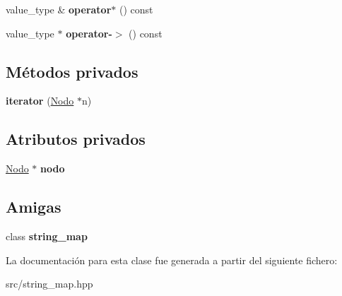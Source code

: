 \begin{DoxyCompactItemize}
\item 
\hypertarget{classstring__map_1_1iterator_a9275f28d7915452c12354017ee945dbd}{value\+\_\+type \& {\bfseries operator$\ast$} () const }\label{classstring__map_1_1iterator_a9275f28d7915452c12354017ee945dbd}

\item 
\hypertarget{classstring__map_1_1iterator_a81541598632d70917372f5b2b91b65d8}{value\+\_\+type $\ast$ {\bfseries operator-\/$>$} () const }\label{classstring__map_1_1iterator_a81541598632d70917372f5b2b91b65d8}

\end{DoxyCompactItemize}
\subsection*{Métodos privados}
\begin{DoxyCompactItemize}
\item 
\hypertarget{classstring__map_1_1iterator_a9adc687055baa860aaddb8f2f955ae1a}{{\bfseries iterator} (\hyperlink{structstring__map_1_1Nodo}{Nodo} $\ast$n)}\label{classstring__map_1_1iterator_a9adc687055baa860aaddb8f2f955ae1a}

\end{DoxyCompactItemize}
\subsection*{Atributos privados}
\begin{DoxyCompactItemize}
\item 
\hypertarget{classstring__map_1_1iterator_ac153c60abe33692e040a47f7f7457db8}{\hyperlink{structstring__map_1_1Nodo}{Nodo} $\ast$ {\bfseries nodo}}\label{classstring__map_1_1iterator_ac153c60abe33692e040a47f7f7457db8}

\end{DoxyCompactItemize}
\subsection*{Amigas}
\begin{DoxyCompactItemize}
\item 
\hypertarget{classstring__map_1_1iterator_a70a1267e13829b1e5be02846caf0ee84}{class {\bfseries string\+\_\+map}}\label{classstring__map_1_1iterator_a70a1267e13829b1e5be02846caf0ee84}

\end{DoxyCompactItemize}


La documentación para esta clase fue generada a partir del siguiente fichero\+:\begin{DoxyCompactItemize}
\item 
src/string\+\_\+map.\+hpp\end{DoxyCompactItemize}

